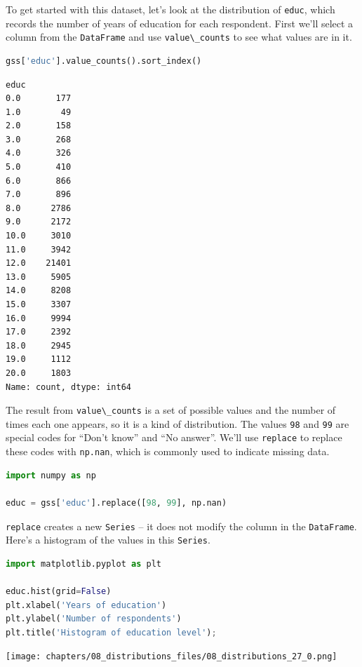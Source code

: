 To get started with this dataset, let's look at the distribution of
\passthrough{\lstinline!educ!}, which records the number of years of
education for each respondent. First we'll select a column from the
\passthrough{\lstinline!DataFrame!} and use
\passthrough{\lstinline!value\_counts!} to see what values are in it.

\begin{lstlisting}[language=Python,style=source]
gss['educ'].value_counts().sort_index()
\end{lstlisting}

\begin{lstlisting}[style=output]
educ
0.0       177
1.0        49
2.0       158
3.0       268
4.0       326
5.0       410
6.0       866
7.0       896
8.0      2786
9.0      2172
10.0     3010
11.0     3942
12.0    21401
13.0     5905
14.0     8208
15.0     3307
16.0     9994
17.0     2392
18.0     2945
19.0     1112
20.0     1803
Name: count, dtype: int64
\end{lstlisting}

The result from \passthrough{\lstinline!value\_counts!} is a set of
possible values and the number of times each one appears, so it is a
kind of distribution. The values \passthrough{\lstinline!98!} and
\passthrough{\lstinline!99!} are special codes for ``Don't know'' and
``No answer''. We'll use \passthrough{\lstinline!replace!} to replace
these codes with \passthrough{\lstinline!np.nan!}, which is commonly
used to indicate missing data.

\begin{lstlisting}[language=Python,style=source]
import numpy as np

educ = gss['educ'].replace([98, 99], np.nan)
\end{lstlisting}

\passthrough{\lstinline!replace!} creates a new
\passthrough{\lstinline!Series!} -- it does not modify the column in the
\passthrough{\lstinline!DataFrame!}. Here's a histogram of the values in
this \passthrough{\lstinline!Series!}.

\begin{lstlisting}[language=Python,style=source]
import matplotlib.pyplot as plt

educ.hist(grid=False)
plt.xlabel('Years of education')
plt.ylabel('Number of respondents')
plt.title('Histogram of education level');
\end{lstlisting}

\begin{center}
\texttt{[image: chapters/08\_distributions\_files/08\_distributions\_27\_0.png]}
\end{center}

